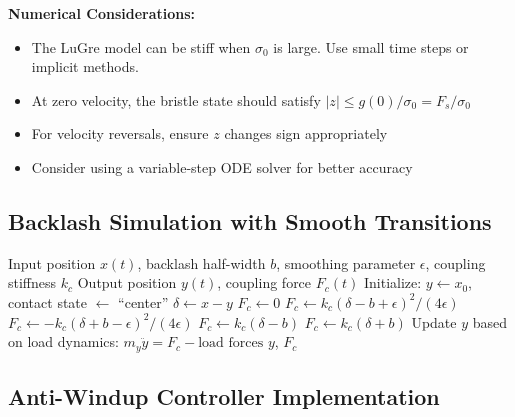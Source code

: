 \textbf{Numerical Considerations:}
\begin{itemize}
    \item The LuGre model can be stiff when $\sigma_0$ is large. Use small time steps or implicit methods.
    \item At zero velocity, the bristle state should satisfy $|z| \leq g(0)/\sigma_0 = F_s/\sigma_0$
    \item For velocity reversals, ensure $z$ changes sign appropriately
    \item Consider using a variable-step ODE solver for better accuracy
\end{itemize}

\subsection{Backlash Simulation with Smooth Transitions}

\begin{algorithm}[H]
\caption{Smoothed Backlash Model}
\label{alg:backlash}
\begin{algorithmic}[1]
\REQUIRE Input position $x(t)$, backlash half-width $b$, smoothing parameter $\epsilon$, coupling stiffness $k_c$
\ENSURE Output position $y(t)$, coupling force $F_c(t)$
\STATE Initialize: $y \gets x_0$, contact state $\gets$ ``center''
    \STATE $\delta \gets x - y$ 
        \STATE $F_c \gets 0$ 
        \STATE {}
            \STATE $F_c \gets k_c (\delta - b + \epsilon)^2 / (4\epsilon)$
        \ELSE
            \STATE $F_c \gets -k_c (\delta + b - \epsilon)^2 / (4\epsilon)$
        \ENDIF
    \ELSE
        \STATE {}
            \STATE $F_c \gets k_c (\delta - b)$
        \ELSE
            \STATE $F_c \gets k_c (\delta + b)$
        \ENDIF
    \ENDIF
    \STATE Update $y$ based on load dynamics: $m_y \ddot{y} = F_c - \text{load forces}$
\ENDFOR
\RETURN $y$, $F_c$
\end{algorithmic}
\end{algorithm}

\subsection{Anti-Windup Controller Implementation}

